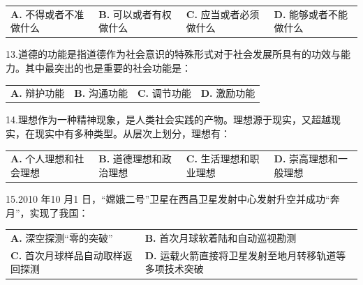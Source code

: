 \documentclass[UTF8,11pt]{ctexart}
\begin{document}
\begin{center}\begin{tabular}{>{\raggedright\arraybackslash}p{\dimexpr(\linewidth-8\tabcolsep)/4\relax}>{\raggedright\arraybackslash}p{\dimexpr(\linewidth-8\tabcolsep)/4\relax}>{\raggedright\arraybackslash}p{\dimexpr(\linewidth-8\tabcolsep)/4\relax}>{\raggedright\arraybackslash}p{\dimexpr(\linewidth-8\tabcolsep)/4\relax}}
\textbf{A.} 不得或者不准做什么 & \textbf{B.} 可以或者有权做什么 & \textbf{C.} 应当或者必须做什么 & \textbf{D.} 能够或者不能做什么\\[.35em]\end{tabular}\end{center}

13.道德的功能是指道德作为社会意识的特殊形式对于社会发展所具有的功效与能力。其中最突出的也是重要的社会功能是：


\begin{center}\begin{tabular}{>{\raggedright\arraybackslash}p{\dimexpr(\linewidth-8\tabcolsep)/4\relax}>{\raggedright\arraybackslash}p{\dimexpr(\linewidth-8\tabcolsep)/4\relax}>{\raggedright\arraybackslash}p{\dimexpr(\linewidth-8\tabcolsep)/4\relax}>{\raggedright\arraybackslash}p{\dimexpr(\linewidth-8\tabcolsep)/4\relax}}
\textbf{A.} 辩护功能 & \textbf{B.} 沟通功能 & \textbf{C.} 调节功能 & \textbf{D.} 激励功能\\[.35em]\end{tabular}\end{center}

14.理想作为一种精神现象，是人类社会实践的产物。理想源于现实，又超越现实，在现实中有多种类型。从层次上划分，理想有：


\begin{center}\begin{tabular}{>{\raggedright\arraybackslash}p{\dimexpr(\linewidth-8\tabcolsep)/4\relax}>{\raggedright\arraybackslash}p{\dimexpr(\linewidth-8\tabcolsep)/4\relax}>{\raggedright\arraybackslash}p{\dimexpr(\linewidth-8\tabcolsep)/4\relax}>{\raggedright\arraybackslash}p{\dimexpr(\linewidth-8\tabcolsep)/4\relax}}
\textbf{A.} 个人理想和社会理想 & \textbf{B.} 道德理想和政治理想 & \textbf{C.} 生活理想和职业理想 & \textbf{D.} 崇高理想和一般理想\\[.35em]\end{tabular}\end{center}

15.2010 年10 月1 日，“嫦娥二号”卫星在西昌卫星发射中心发射升空并成功“奔月”，实现了我国：


\begin{center}\begin{tabular}{>{\raggedright\arraybackslash}p{\dimexpr(\linewidth-4\tabcolsep)/2\relax}>{\raggedright\arraybackslash}p{\dimexpr(\linewidth-4\tabcolsep)/2\relax}}
\textbf{A.} 深空探测“零的突破” & \textbf{B.} 首次月球软着陆和自动巡视勘测\\[.35em]
\textbf{C.} 首次月球样品自动取样返回探测 & \textbf{D.} 运载火箭直接将卫星发射至地月转移轨道等多项技术突破\\[.35em]\end{tabular}\end{center}
\end{document}
